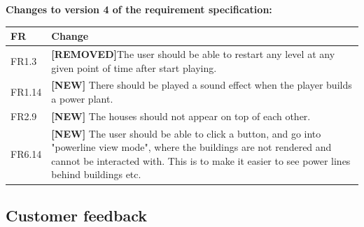 	{\bf Changes to version 4 of the requirement specification:} \\
	\begin{tabular}{| p{1.5cm} | p{12cm} |}
		\hline
		\rowcolor{lightgray}
		{\bf FR} & {\bf Change} \\ \hline
		FR1.3 & {\bf \color{red}[REMOVED]}The user should be able to restart any level at any given point of time after start playing. \\ \hline
		FR1.14 & {\bf \color{green}[NEW]} There should be played a sound effect when the player builds a power plant. \\ \hline
		FR2.9 & {\bf \color{green}[NEW]} The houses should not appear on top of each other. \\ \hline
		FR6.14 & {\bf \color{green}[NEW]} The user should be able to click a button, and go into "powerline view mode", where the buildings are not rendered and cannot be interacted with. This is to make it easier to see power lines behind buildings etc. \\ \hline
	\end{tabular}

\subsection{Customer feedback}

	
